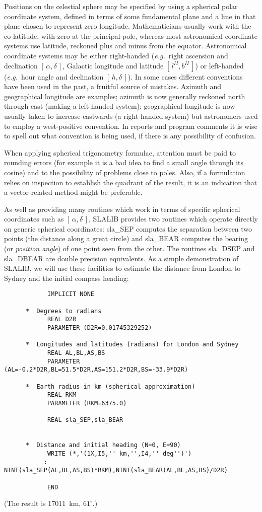 \documentclass[11pt,twoside]{article}
\newcommand{\radec}     {$[\,\alpha,\delta\,]$}
\newcommand{\hadec}     {$[\,h,\delta\,]$}
\newcommand{\gal}       {$[\,l^{I\!I},b^{I\!I}\,]$}
\begin{document}
Positions on the celestial sphere may be specified by using
a spherical polar coordinate system, defined in terms of
some fundamental plane and a line in that plane chosen to
represent zero longitude.  Mathematicians usually work with the
co-latitude, with zero at the principal pole, whereas most
astronomical coordinate systems use latitude, reckoned plus and
minus from the equator.
Astronomical coordinate systems may be either right-handed
({\it e.g.}\ right ascension and declination \radec,
Galactic longitude and latitude \gal)
or left-handed ({\it e.g.}\ hour angle and
declination \hadec).  In some cases
different conventions have been used in the past, a fruitful source of
mistakes.  Azimuth and geographical longitude are examples;  azimuth
is now generally reckoned north through east
(making a left-handed system);  geographical longitude is now usually
taken to increase eastwards (a right-handed system) but astronomers
used to employ a west-positive convention.  In reports
and program comments it is wise to spell out what convention
is being used, if there is any possibility of confusion.

When applying spherical trigonometry formulae, attention must be
paid to
rounding errors (for example it is a bad idea to find a
small angle through its cosine) and to the possibility of
problems close to poles.
Also, if a formulation relies on inspection to establish
the quadrant of the result, it is an indication that a vector-related
method might be preferable.

As well as providing many routines which work in terms of specific
spherical coordinates such as \radec, SLALIB provides
two routines which operate directly on generic spherical
coordinates:
sla\_SEP
computes the separation between
two points (the distance along a great circle) and
sla\_BEAR
computes the bearing (or {\it position angle})
of one point seen from the other.  The routines
sla\_DSEP
and
sla\_DBEAR
are double precision equivalents.  As a simple demonstration
of SLALIB, we will use these facilities to estimate the distance from
London to Sydney and the initial compass heading:
\goodbreak
\begin{verbatim}
            IMPLICIT NONE

      *  Degrees to radians
            REAL D2R
            PARAMETER (D2R=0.01745329252)

      *  Longitudes and latitudes (radians) for London and Sydney
            REAL AL,BL,AS,BS
            PARAMETER (AL=-0.2*D2R,BL=51.5*D2R,AS=151.2*D2R,BS=-33.9*D2R)

      *  Earth radius in km (spherical approximation)
            REAL RKM
            PARAMETER (RKM=6375.0)

            REAL sla_SEP,sla_BEAR


      *  Distance and initial heading (N=0, E=90)
            WRITE (*,'(1X,I5,'' km,'',I4,'' deg'')')
           :    NINT(sla_SEP(AL,BL,AS,BS)*RKM),NINT(sla_BEAR(AL,BL,AS,BS)/D2R)

            END
\end{verbatim}
\goodbreak
(The result is 17011~km, $61^\circ$.)
\end{document}
